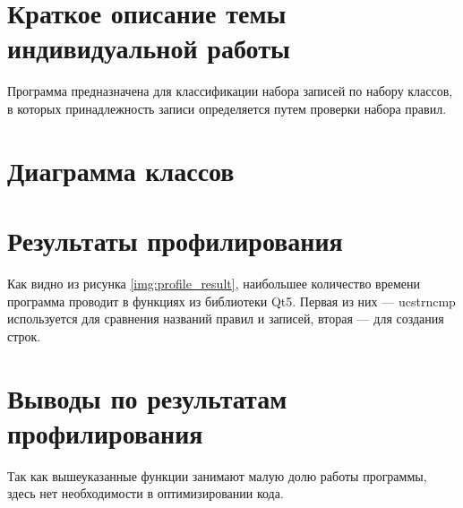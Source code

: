 \section{Краткое описание темы индивидуальной работы}
Программа предназначена для классификации набора записей по набору классов, в 
которых принадлежность записи определяется путем проверки набора правил.

\section{Диаграмма классов}

\section{Результаты профилирования}
Как видно из рисунка \ref{img:profile_result}, наибольшее количество времени программа проводит в функциях из библиотеки Qt5. Первая из них — ucstrncmp используется для сравнения названий правил и записей, вторая — для создания строк.

\section{Выводы по результатам профилирования}
Так как вышеуказанные функции занимают малую долю работы программы, здесь нет необходимости в оптимизировании кода.
